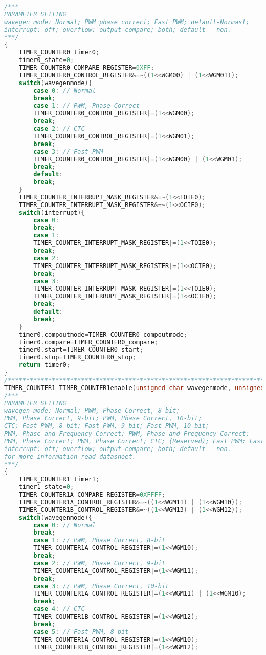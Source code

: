 \begin{lstlisting}[language=C, caption={atmega128timer.c}, label=atmega128timer-c, captionpos=b]
/***
PARAMETER SETTING
wavegen mode: Normal; PWM phase correct; Fast PWM; default-Normasl;
interrupt: off; overflow; output compare; both; default - non.
***/
{
	TIMER_COUNTER0 timer0;
	timer0_state=0;
	TIMER_COUNTER0_COMPARE_REGISTER=0XFF;
	TIMER_COUNTER0_CONTROL_REGISTER&=~((1<<WGM00) | (1<<WGM01));
	switch(wavegenmode){
		case 0: // Normal
		break;
		case 1: // PWM, Phase Correct
		TIMER_COUNTER0_CONTROL_REGISTER|=(1<<WGM00);
		break;
		case 2: // CTC
		TIMER_COUNTER0_CONTROL_REGISTER|=(1<<WGM01);
		break;
		case 3: // Fast PWM
		TIMER_COUNTER0_CONTROL_REGISTER|=(1<<WGM00) | (1<<WGM01);
		break;
		default:
		break;
	}
	TIMER_COUNTER_INTERRUPT_MASK_REGISTER&=~(1<<TOIE0);
	TIMER_COUNTER_INTERRUPT_MASK_REGISTER&=~(1<<OCIE0);
	switch(interrupt){
		case 0: 
		break;
		case 1:
		TIMER_COUNTER_INTERRUPT_MASK_REGISTER|=(1<<TOIE0);
		break;
		case 2:
		TIMER_COUNTER_INTERRUPT_MASK_REGISTER|=(1<<OCIE0);
		break;
		case 3:
		TIMER_COUNTER_INTERRUPT_MASK_REGISTER|=(1<<TOIE0);
		TIMER_COUNTER_INTERRUPT_MASK_REGISTER|=(1<<OCIE0);
		break;
		default:
		break;
	}
	timer0.compoutmode=TIMER_COUNTER0_compoutmode;
	timer0.compare=TIMER_COUNTER0_compare;
	timer0.start=TIMER_COUNTER0_start;
	timer0.stop=TIMER_COUNTER0_stop;
	return timer0;
}
/*****************************************************************************************/
TIMER_COUNTER1 TIMER_COUNTER1enable(unsigned char wavegenmode, unsigned char interrupt)
/***
PARAMETER SETTING
wavegen mode: Normal; PWM, Phase Correct, 8-bit;
PWM, Phase Correct, 9-bit; PWM, Phase Correct, 10-bit;
CTC; Fast PWM, 8-bit; Fast PWM, 9-bit; Fast PWM, 10-bit;
PWM, Phase and Frequency Correct; PWM, Phase and Frequency Correct;
PWM, Phase Correct; PWM, Phase Correct; CTC; (Reserved); Fast PWM; Fast PWM.
interrupt: off; overflow; output compare; both; default - non.
for more information read datasheet.
***/
{
	TIMER_COUNTER1 timer1;
	timer1_state=0;
	TIMER_COUNTER1A_COMPARE_REGISTER=0XFFFF;
	TIMER_COUNTER1A_CONTROL_REGISTER&=~((1<<WGM11) | (1<<WGM10));
	TIMER_COUNTER1B_CONTROL_REGISTER&=~((1<<WGM13) | (1<<WGM12));
	switch(wavegenmode){
		case 0: // Normal
		break;
		case 1: // PWM, Phase Correct, 8-bit
		TIMER_COUNTER1A_CONTROL_REGISTER|=(1<<WGM10);
		break;
		case 2:	// PWM, Phase Correct, 9-bit
		TIMER_COUNTER1A_CONTROL_REGISTER|=(1<<WGM11);
		break;
		case 3:	// PWM, Phase Correct, 10-bit
		TIMER_COUNTER1A_CONTROL_REGISTER|=(1<<WGM11) | (1<<WGM10);
		break;
		case 4:	// CTC
		TIMER_COUNTER1B_CONTROL_REGISTER|=(1<<WGM12);
		break;
		case 5:	// Fast PWM, 8-bit
		TIMER_COUNTER1A_CONTROL_REGISTER|=(1<<WGM10);
		TIMER_COUNTER1B_CONTROL_REGISTER|=(1<<WGM12);

\end{lstlisting}
